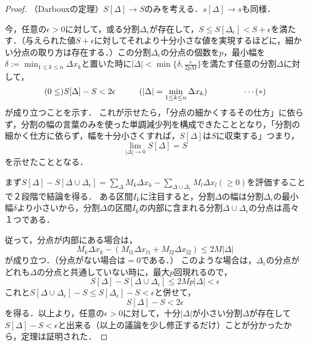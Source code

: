 \documentclass[uplatex, dvipdfmx]{jsreport}
\begin{document}
\begin{proof}{（Darbouxの定理）}$S[\Delta]\rightarrow S$のみを考える．$s[\Delta]\rightarrow s$も同様．

    今，任意の$\epsilon >0$に対して，或る分割$\Delta_\epsilon$が存在して，$S\le S[\Delta_\epsilon]<S+\epsilon$を満たす．（与えられた値$S+\epsilon$に対してそれより十分小さな値を実現するほどに，細かい分点の取り方は存在する．）この分割$\Delta_\epsilon$の分点の個数を$p$，最小幅を$\delta := \min_{1\le k\le n}\Delta x_k$と置いた時に$|\Delta| < \min \{ \delta,\frac{\epsilon}{2pM} \}$を満たす任意の分割$\Delta$に対して，
    $$(0\le) S[\Delta]-S<2\epsilon \hspace{10mm} (|\Delta|=\min_{1\le k\le n}\Delta x_k) \hspace{15mm}\cdots (*)$$が成り立つことを示す．
    これが示せたら，「分点の細かくするその仕方」に依らず，分割の幅の言葉のみを使った単調減少列を構成できたこととなり，「分割の細かく仕方に依らず，幅を十分小さくすれば，$S[\Delta]$は$S$に収束する」つまり，$$\lim_{|\Delta|\rightarrow0}S[\Delta]=S$$を示せたこととなる．

    まず$S[\Delta] - S[\Delta\cup\Delta_\epsilon] = \sum_\Delta M_k \Delta x_k - \sum_{\Delta\cup\Delta_\epsilon}M_l \Delta x_l (\ge 0)$を評価することで２段階で結論を得る．
    ある区間$I_k$に注目すると，分割$\Delta$の幅は分割$\Delta_\epsilon$の最小幅$\delta$より小さいから，分割$\Delta$の区間$I_k$の内部に含まれる分割$\Delta\cup\Delta_\epsilon$の分点は高々１つである．
    従って，分点が内部にある場合は，$$M_k\Delta x_k - (M_{l1}\Delta x_{l1} + M_{l2}\Delta x_{l2}) \le 2M|\Delta |$$が成り立つ．（分点がない場合は$=0$である．）
    このような場合は，$\Delta_\epsilon$の分点がどれも$\Delta$の分点と共通していない時に，最大$p$回現れるので，$$S[\Delta] - S[\Delta\cup\Delta_\epsilon] \le 2Mp|\Delta | < \epsilon$$
    これと$S[\Delta\cup\Delta_\epsilon]-S\le S[\Delta_\epsilon]-S<\epsilon$と併せて，$$S[\Delta]-S<2\epsilon$$を得る．以上より，任意の$\epsilon >0$に対して，十分$|\Delta |$が小さい分割$\Delta$が存在して$S[\Delta]-S<\epsilon$と出来る（以上の議論を少し修正するだけ）ことが分かったから，定理は証明された．
\end{proof}
\end{document}
